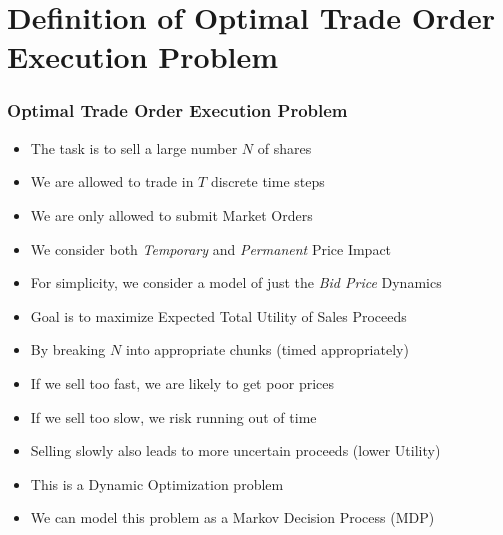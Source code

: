 \documentclass[handout]{beamer}
\begin{document}
\section{Definition of Optimal Trade Order Execution Problem}

\begin{frame}
\frametitle{Optimal Trade Order Execution Problem}
\pause
\begin{itemize}[<+->]
\item The task is to sell a large number $N$ of shares
\item We are allowed to trade in $T$ discrete time steps
\item We are only allowed to submit Market Orders
\item We consider both {\em Temporary} and {\em Permanent} Price Impact
\item For simplicity, we consider a model of just the {\em Bid Price} Dynamics
\item Goal is to maximize Expected Total Utility of Sales Proceeds
\item By breaking $N$ into appropriate chunks (timed appropriately)
\item If we sell too fast, we are likely to get poor prices
\item If we sell too slow, we risk running out of time
\item Selling slowly also leads to more uncertain proceeds (lower Utility)
\item This is a Dynamic Optimization problem
\item We can model this problem as a Markov Decision Process (MDP)
\end{itemize}
\end{frame}
\end{document}
